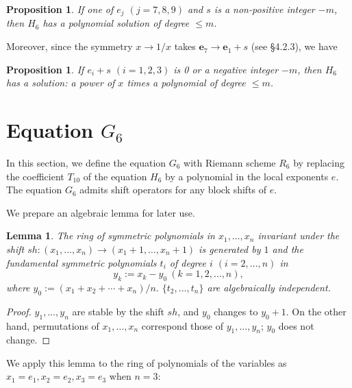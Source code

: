 \documentclass[a4paper,12pt]{article}
\newtheorem{lemma}[thm]{Lemma}
\newtheorem{prp}[thm]{Proposition}
\theoremstyle{definition}
\theoremstyle{remark}
\numberwithin{equation}{section} %
\begin{document}
\begin{prp}\label{polynomSol1}If one of $e_j$ $(j=7,8,9)$ and $s$ is a non-positive integer $-m$, then $H_6$ has a polynomial solution of degree $\le m$.
\end{prp}

Moreover, since the symmetry $x\to1/x$ takes ${\bm e}_7\to {\bm e}_1+{ s}$ (see \S 4.2.3), we have
\begin{prp}\label{polynomSol2}If $e_i+s$ $(i=1,2,3)$ is 0 or a negative integer $-m$, then $H_6$ has a solution: a power of $x$ times a polynomial of degree $\le m$. 
\end{prp}



\newpage
\section{Equation $G_6$}\secttoc
In this section, we define the equation $G_6$ with Riemann scheme
$R_6$ by replacing the coefficient $T_{10}$ of the equation $H_6$ by a polynomial in the local exponents $e$. The equation $G_6$ admits shift operators for any block shifts of $e$. 
\medskip

We prepare an algebraic lemma for later use.

\begin{lemma}The ring of symmetric polynomials in $x_1,\dots,x_n$ invariant under the shift $sh:(x_1,\dots,x_n)\to(x_1+1,\dots,x_n+1)$ is generated by $1$ and the fundamental symmetric polynomials $t_i$ of degree $i$ $(i=2,\dots,n)$ in
  $$y_k := x_k - y_0\ (k=1,2,\dots,n),$$
where $y_0 := (x_1+x_2+\cdots+x_n)/n.$   $\{t_2,\dots,t_n\}$ are algebraically independent.
\end{lemma}
\begin{proof}  $y_1,\dots,y_n$ are stable by the shift $sh$, and $y_0$ changes to $y_0+1$. On the other hand, permutations of $x_1,\dots,x_n$ correspond those of $y_1,\dots,y_n$; $y_0$ does not change.
\end{proof}

We apply this lemma to the ring of polynomials of the variables as $x_1=e_1,x_2=e_2,x_3=e_3$ when $n=3$:%
\end{document}
